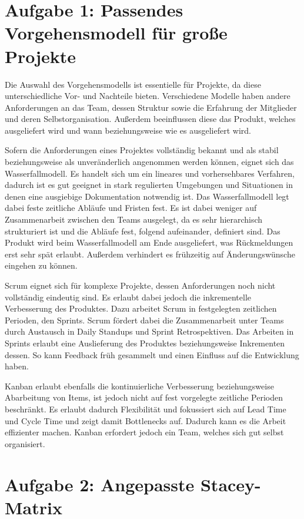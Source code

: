\section*{Aufgabe 1: Passendes Vorgehensmodell für große Projekte}

Die Auswahl des Vorgehensmodells ist essentielle für Projekte, da diese unterschiedliche Vor- und Nachteile bieten. Verschiedene Modelle haben andere Anforderungen an das Team, dessen Struktur sowie die Erfahrung der Mitglieder und deren Selbstorganisation. Außerdem beeinflussen diese das Produkt, welches ausgeliefert wird und wann beziehungsweise wie es ausgeliefert wird.

Sofern die Anforderungen eines Projektes vollständig bekannt und als stabil beziehungsweise als unveränderlich angenommen werden können, eignet sich das Wasserfallmodell. Es handelt sich um ein lineares und vorhersehbares Verfahren, dadurch ist es gut geeignet in stark regulierten Umgebungen und Situationen in denen eine ausgiebige Dokumentation notwendig ist.
Das Wasserfallmodell legt dabei feste zeitliche Abläufe und Fristen fest. Es ist dabei weniger auf Zusammenarbeit zwischen den Teams ausgelegt, da es sehr hierarchisch strukturiert ist und die Abläufe fest, folgend aufeinander, definiert sind.
Das Produkt wird beim Wasserfallmodell am Ende ausgeliefert, was Rückmeldungen erst sehr spät erlaubt. Außerdem verhindert es frühzeitig auf Änderungswünsche eingehen zu können.

Scrum eignet sich für komplexe Projekte, dessen Anforderungen noch nicht vollständig eindeutig sind. Es erlaubt dabei jedoch die inkrementelle Verbesserung des Produktes. Dazu arbeitet Scrum in festgelegten zeitlichen Perioden, den Sprints.
Scrum fördert dabei die Zusammenarbeit unter Teams durch Austausch in Daily Standups und Sprint Retrospektiven. Das Arbeiten in Sprints erlaubt eine Auslieferung des Produktes beziehungsweise Inkrementen dessen. So kann Feedback früh gesammelt und einen Einfluss auf die Entwicklung haben.

Kanban erlaubt ebenfalls die kontinuierliche Verbesserung beziehungsweise Abarbeitung von Items, ist jedoch nicht auf fest vorgelegte zeitliche Perioden beschränkt. Es erlaubt dadurch Flexibilität und fokussiert sich auf Lead Time und Cycle Time und zeigt damit Bottlenecks auf. Dadurch kann es die Arbeit effizienter machen.
Kanban erfordert jedoch ein Team, welches sich gut selbst organisiert.

\section*{Aufgabe 2: Angepasste Stacey-Matrix}

